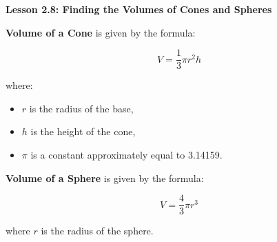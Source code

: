  \begin{center}
\noindent\textbf{Lesson 2.8: Finding the Volumes of Cones and Spheres}
\end{center}

\noindent\textbf{Volume of a Cone} is given by the formula:

\vspace*{-1ex}
\[
V = \frac{1}{3} \pi r^2 h
\]
\vspace*{-1ex}

where:
\begin{itemize}[noitemsep]
    \item \( r \) is the radius of the base,
    \item \( h \) is the height of the cone,
    \item \( \pi \) is a constant approximately equal to 3.14159.
\end{itemize}

\noindent\textbf{Volume of a Sphere} is given by the formula:

\vspace*{-1ex}
\[
V = \frac{4}{3} \pi r^3
\]

\vspace*{-1ex}
where \( r \) is the radius of the sphere.



